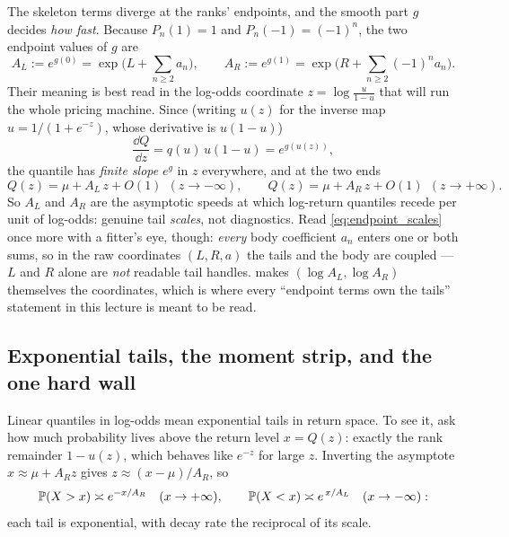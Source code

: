\documentclass[11pt]{article}
\begin{document}
The skeleton terms diverge at the ranks' endpoints, and the smooth part $g$
decides \emph{how fast}.  Because $P_n(1)=1$ and $P_n(-1)=(-1)^{n}$, the two
endpoint values of $g$ are
\begin{equation}
A_L:=e^{g(0)}=\exp\Big(L+\sum_{n\ge2}a_n\Big),
\qquad
A_R:=e^{g(1)}=\exp\Big(R+\sum_{n\ge2}(-1)^{n}a_n\Big).
\label{eq:endpoint_scales}
\end{equation}
Their meaning is best read in the log-odds coordinate $z=\log\frac{u}{1-u}$
that will run the whole pricing machine.  Since (writing $u(z)$ for the
inverse map $u=1/(1+e^{-z})$, whose derivative is $u(1-u)$)
\begin{equation}
\frac{\dd Q}{\dd z}=q(u)\,u(1-u)=e^{g(u(z))},
\label{eq:q_logit}
\end{equation}
the quantile has \emph{finite slope} $e^{g}$ in $z$ everywhere, and at the
two ends
\begin{equation}
Q(z)=\mu+A_L\,z+O(1)\ \ (z\to-\infty),
\qquad
Q(z)=\mu+A_R\,z+O(1)\ \ (z\to+\infty).
\end{equation}
So $A_L$ and $A_R$ are the asymptotic speeds at which log-return quantiles
recede per unit of log-odds: genuine tail \emph{scales}, not diagnostics.
Read \eqref{eq:endpoint_scales} once more with a fitter's eye, though:
\emph{every} body coefficient $a_n$ enters one or both sums, so in the raw
coordinates $(L,R,a)$ the tails and the body are coupled --- $L$ and $R$
alone are \emph{not} readable tail handles.   makes
$(\log A_L,\log A_R)$ themselves the coordinates, which is where every
``endpoint terms own the tails'' statement in this lecture is meant to be
read.

\subsection{Exponential tails, the moment strip, and the one hard wall}

Linear quantiles in log-odds mean exponential tails in return space.  To see
it, ask how much probability lives above the return level $x=Q(z)$: exactly
the rank remainder $1-u(z)$, which behaves like $e^{-z}$ for large $z$.
Inverting the asymptote $x\approx\mu+A_Rz$ gives $z\approx(x-\mu)/A_R$, so
\begin{equation}
\mathbb{P}(X>x)\asymp e^{-x/A_R}\quad(x\to+\infty),
\qquad
\mathbb{P}(X<x)\asymp e^{\,x/A_L}\quad(x\to-\infty):
\label{eq:exp_tails}
\end{equation}
each tail is exponential, with decay rate the reciprocal of its scale.
\end{document}
